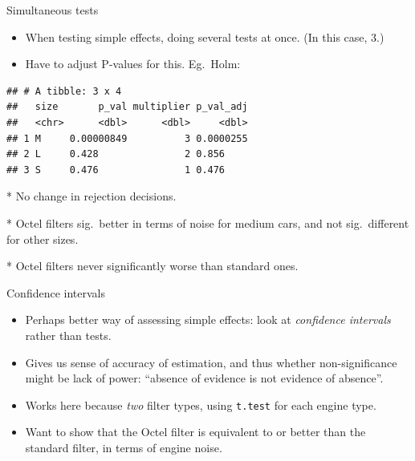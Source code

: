\documentclass[ignorenonframetext,]{beamer}
\newenvironment{Shaded}{\begin{snugshade}}{\end{snugshade}}
\newcommand{\DataTypeTok}[1]{\textcolor[rgb]{0.13,0.29,0.53}{#1}}
\newcommand{\DecValTok}[1]{\textcolor[rgb]{0.00,0.00,0.81}{#1}}
\newcommand{\KeywordTok}[1]{\textcolor[rgb]{0.13,0.29,0.53}{\textbf{#1}}}
\newcommand{\NormalTok}[1]{#1}
\newcommand{\OperatorTok}[1]{\textcolor[rgb]{0.81,0.36,0.00}{\textbf{#1}}}
\newcommand{\StringTok}[1]{\textcolor[rgb]{0.31,0.60,0.02}{#1}}
\begin{document}
\begin{frame}[fragile]{Simultaneous tests}
\protect\hypertarget{simultaneous-tests}{}

\begin{itemize}
\item
  When testing simple effects, doing several tests at once. (In this
  case, 3.)
\item
  Have to adjust P-values for this. Eg.~Holm:
\end{itemize}

\small

\begin{Shaded}
\end{Shaded}

\begin{verbatim}
## # A tibble: 3 x 4
##   size       p_val multiplier p_val_adj
##   <chr>      <dbl>      <dbl>     <dbl>
## 1 M     0.00000849          3 0.0000255
## 2 L     0.428               2 0.856    
## 3 S     0.476               1 0.476
\end{verbatim}

\normalsize

\begin{footnotesize}

* No change in rejection decisions.

* Octel filters sig.\ better in terms of noise for
medium cars, and not sig.\ different for other sizes.

* Octel filters never significantly worse than standard
ones. 
\end{footnotesize}

\end{frame}

\begin{frame}[fragile]{Confidence intervals}
\protect\hypertarget{confidence-intervals}{}

\begin{itemize}
\item
  Perhaps better way of assessing simple effects: look at
  \emph{confidence intervals} rather than tests.
\item
  Gives us sense of accuracy of estimation, and thus whether
  non-significance might be lack of power: ``absence of evidence is not
  evidence of absence''.
\item
  Works here because \emph{two} filter types, using \texttt{t.test} for
  each engine type.
\item
  Want to show that the Octel filter is equivalent to or better than the
  standard filter, in terms of engine noise.
\end{itemize}

\end{frame}
\end{document}
